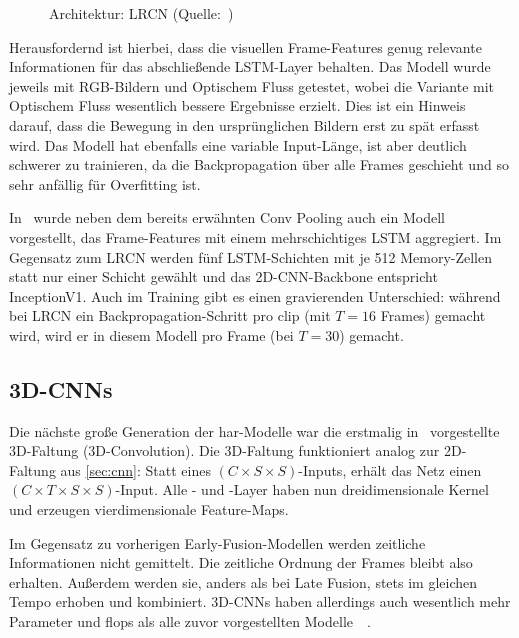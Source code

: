 \begin{figure}[h!]
    \centering
    \caption{Architektur: LRCN (Quelle:~\cite{Donahue14})}
    \label{fig:lrcn}
\end{figure}

Herausfordernd ist hierbei, dass die visuellen Frame-Features genug relevante Informationen für das abschließende LSTM-Layer behalten.
Das Modell wurde jeweils mit RGB-Bildern und Optischem Fluss getestet, wobei die Variante mit Optischem Fluss wesentlich bessere Ergebnisse erzielt.
Dies ist \ua ein Hinweis darauf, dass die Bewegung in den ursprünglichen Bildern erst zu spät erfasst wird.
Das Modell hat ebenfalls eine variable Input-Länge, ist aber deutlich schwerer zu trainieren, da die Backpropagation über alle Frames geschieht und so sehr anfällig für Overfitting ist.

In~\cite{Ng15} wurde neben dem bereits erwähnten Conv Pooling auch ein Modell vorgestellt, das Frame-Features mit einem mehrschichtiges LSTM aggregiert.
Im Gegensatz zum LRCN werden fünf LSTM-Schichten mit je 512 Memory-Zellen statt nur einer Schicht gewählt und das 2D-CNN-Backbone entspricht InceptionV1.
Auch im Training gibt es einen gravierenden Unterschied:
während bei LRCN ein Backpropagation-Schritt pro \gls{clip} (mit $T = 16$ Frames) gemacht wird, wird er in diesem Modell pro Frame (bei $T = 30$) gemacht.

\subsection{3D-CNNs}
\label{subsec:3d-conv}

Die nächste große Generation der \gls{har}-Modelle war die erstmalig in~\cite{Ji13} vorgestellte 3D-Faltung (3D-Convolution).
Die 3D-Faltung funktioniert analog zur 2D-Faltung aus \autoref{sec:cnn}:
Statt eines $(C \times S \times S)$-Inputs, erhält das Netz einen $(C \times T \times S \times S)$-Input.
Alle \conv- und \pool-Layer haben nun dreidimensionale Kernel und erzeugen vierdimensionale Feature-Maps.

Im Gegensatz zu vorherigen Early-Fusion-Modellen werden zeitliche Informationen nicht gemittelt.
Die zeitliche Ordnung der Frames bleibt also erhalten.
Außerdem werden sie, anders als bei Late Fusion, stets im gleichen Tempo erhoben und kombiniert.
3D-CNNs haben allerdings auch wesentlich mehr Parameter und \gls{flops} als alle zuvor vorgestellten Modelle~\cite{Zhu19}~\cite{Carreira17}.

